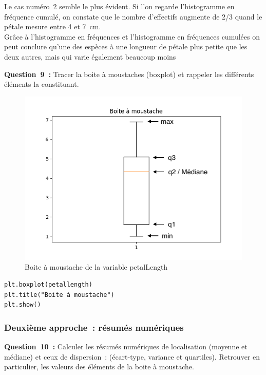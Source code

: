 \vspace{.2cm}

Le cas numéro~2 semble le plus évident. Si l’on regarde l'histogramme en fréquence cumulé, on constate que le nombre d'effectifs augmente de 2/3 quand le pétale mesure entre 4 et 7~cm.\\
Grâce à l'histogramme en fréquences et l'histogramme en fréquences cumulées on peut conclure qu'une des espèces à une longueur de pétale plus petite que les deux autres, mais qui varie également beaucoup moins


\clearpage

\noindent
\textbf{Question~9~:} Tracer la boite à moustaches (boxplot) et rappeler les différents éléments la constituant.

\begin{figure}[!h]
    \begin{center}
        \includegraphics[width=.6\textwidth]{img/Figure_5.png}
        \caption{\label{fig:boite_moustache}Boite à moustache de la variable petalLength}  
    \end{center}
\end{figure}


\begin{lstlisting}[style=myPython, caption=Code Python pour tracer la boite à moustache, frame=lines]
plt.boxplot(petallength)
plt.title("Boite à moustache")
plt.show()
\end{lstlisting}

\vspace{.5cm}




\subsubsection*{Deuxième approche~: résumés numériques}
\vspace{.2cm}

\noindent
\textbf{Question~10~:} Calculer les résumés numériques de localisation (moyenne et médiane) et ceux de dispersion~: (écart-type, variance et quartiles). Retrouver en particulier, les valeurs des éléments de la boite à moustache.
\vspace{.2cm}


